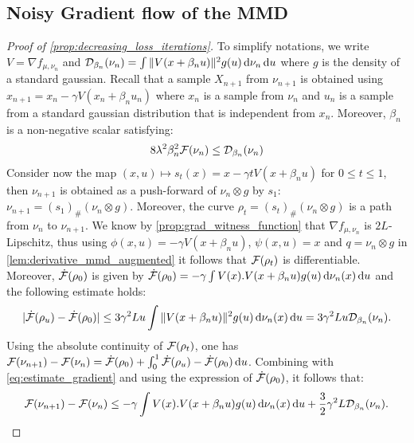 \subsection{Noisy Gradient flow of the MMD}
\begin{proof}[Proof of \cref{prop:decreasing_loss_iterations}]\label{proof:prop:decreasing_loss_iterations}
To simplify notations, we write $V = \nabla f_{\mu,\nu_n}$ and $\mathcal{D}_{\beta_n}(\nu_n)  = \int \Vert V(x+\beta_n u) \Vert^2 g(u)\mathop{}\!\mathrm{d} \nu_n \mathop{}\!\mathrm{d} u $ where $g$ is the density of a standard gaussian. 
	Recall that a sample $X_{n+1}$ from $\nu_{n+1}$ is obtained using  $x_{n+1} = x_n - \gamma V(x_n+ \beta_n u_n)$
	where $x_n$ is a sample from $\nu_n$ and $u_n$ is a sample from a standard gaussian distribution that is independent from $x_n$. Moreover, $\beta_n$ is a non-negative scalar satisfying:
	\begin{align}\label{eq:control_noise_level_bis}
		8\lambda^2\beta_n^2 {{\mathcal F}}(\nu_n) \leq \mathcal{D}_{\beta_n}(\nu_n)  
	\end{align}
	 Consider now the map $(x,u)\mapsto s_t(x)= x - \gamma tV(x+\beta_n u)$ for $0\leq t\leq 1$, then $\nu_{n+1}$ is obtained as a push-forward of $\nu_n\otimes g$ by $s_1$: $\nu_{n+1} = (s_1)_{\#}(\nu_n\otimes g)$. Moreover, the curve $\rho_t = (s_t)_{\#}(\nu_n\otimes g)$ is a path from $\nu_n$ to $\nu_{n+1}$. We know by \cref{prop:grad_witness_function} that $\nabla f_{\mu,\nu_n}$ is $2L$-Lipschitz, thus using $\phi(x,u) = -\gamma V(x+\beta_n u)$, $\psi(x,u) = x$ and $q = \nu_n\otimes g $ in \cref{lem:derivative_mmd_augmented} it follows that ${{\mathcal F}}(\rho_t)$ is differentiable. Moreover, $\dot{{{\mathcal F}}}(\rho_0)$ is given by $\dot{{{\mathcal F}}}(\rho_0)= -\gamma \int V(x).V(x+\beta_n u) g(u)\mathop{}\!\mathrm{d}\nu_n(x)\mathop{}\!\mathrm{d} u$ and the following estimate holds:
	 \begin{align}\label{eq:estimate_gradient}
	 	\vert \dot{{{\mathcal F}}} (\rho_u) -\dot{{{\mathcal F}}}(\rho_0)\vert \leq 3\gamma^2 Lu \int \Vert V(x+\beta_n u) \Vert^2 g(u)\mathop{}\!\mathrm{d}\nu_n(x)\mathop{}\!\mathrm{d} u = 3\gamma^2 Lu \mathcal{D}_{\beta_n}(\nu_n).
	 \end{align}
	Using the absolute continuity of ${{\mathcal F}}(\rho_t)$, one has $\mathcal{F}(\nu_{n+1})-\mathcal{F}(\nu_{n})
	=\dot{{{\mathcal F}}}(\rho_0)+ \int_0^1 \dot{{{\mathcal F}}} (\rho_u) -  \dot{{{\mathcal F}}} (\rho_0) \mathop{}\!\mathrm{d} u $. Combining with  \cref{eq:estimate_gradient} and using the expression of $\dot{{{\mathcal F}}}(\rho_0)$, it follows that:
	\begin{align}\label{eq:taylor_expansion}
	\mathcal{F}(\nu_{n+1})-\mathcal{F}(\nu_{n})
	\leq -\gamma \int V(x).V(x+\beta_n u) g(u)\diff\nu_n(x)\diff u + \frac{3}{2}\gamma^2L \mathcal{D}_{\beta_n}(\nu_n).

\end{align}
\end{proof}
